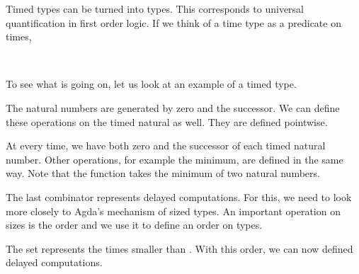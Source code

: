Timed types can be turned into types.
This corresponds to universal quantification in first order logic.
If we think of a time type as a predicate on times, 

\begin{code}%
\>[0]\AgdaSpace{}%
\AgdaSymbol{:}\AgdaSpace{}%
\AgdaSpace{}%
\AgdaSpace{}%
\<%
\\
\>[0]\AgdaSpace{}%
\AgdaSpace{}%
\AgdaSymbol{=}\AgdaSpace{}%
\AgdaSymbol{\{}\AgdaSpace{}%
\AgdaSymbol{:}\AgdaSpace{}%
\AgdaSymbol{\}}\AgdaSpace{}%
\AgdaSpace{}%
\AgdaSpace{}%
\<%
\end{code}

To see what is going on, let us look at an example of a timed type.

The natural numbers are generated by zero and the successor.
We can define these operations on the timed natural as well.
They are defined pointwise.


At every time, we have both zero and the successor of each timed natural number.
Other operations, for example the minimum, are defined in the same way.
Note that the function  takes the minimum of two natural numbers.

The last combinator represents delayed computations.
For this, we need to look more closely to Agda's mechanism of sized types.
An important operation on sizes is the order and we use it to define an order on types.

The set   represents the times smaller than .
With this order, we can now defined delayed computations.

\begin{code}%
\>[0]\AgdaSpace{}%
\AgdaSpace{}%
\AgdaSymbol{(}\AgdaSpace{}%
\AgdaSymbol{:}\AgdaSpace{}%
\AgdaSymbol{)}\AgdaSpace{}%
\AgdaSymbol{(}\AgdaSpace{}%
\AgdaSymbol{:}\AgdaSpace{}%
\AgdaSymbol{)}\AgdaSpace{}%
\AgdaSymbol{:}\AgdaSpace{}%
\AgdaSpace{}%
\<%
\\
\>[0][@{}l@{\AgdaIndent{0}}]%
\>[2]\<%
\\
%
\>[2]\AgdaSpace{}%
\AgdaSpace{}%
\AgdaSymbol{:}\AgdaSpace{}%
\AgdaSymbol{(}\AgdaSpace{}%
\AgdaSymbol{:}\AgdaSpace{}%
\AgdaSpace{}%
\AgdaSymbol{)}\AgdaSpace{}%
\AgdaSpace{}%
\AgdaSpace{}%
\<%
\\
\>[0]\AgdaSpace{}%
\AgdaSpace{}%
\<%
\end{code}


